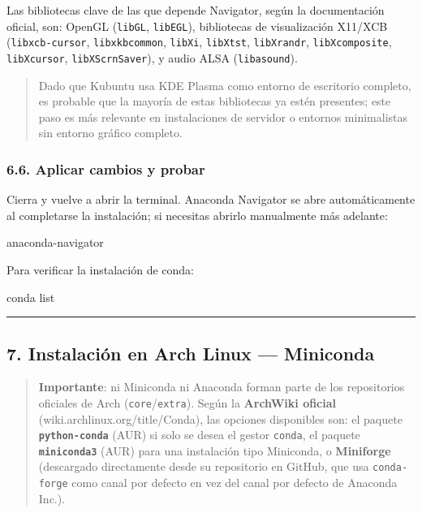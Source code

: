 \documentclass[
  doc,
  floatsintext,
  longtable,
  a4paper,
  nolmodern,
  notxfonts,
  notimes,
  12pt,
  colorlinks=true,linkcolor=blue,citecolor=blue,urlcolor=blue]{apa7}
\newenvironment{Shaded}{\begin{snugshade}}{\end{snugshade}}
\newcommand{\ExtensionTok}[1]{\textcolor[rgb]{0.00,0.23,0.31}{#1}}
\newcommand{\NormalTok}[1]{\textcolor[rgb]{0.00,0.23,0.31}{#1}}
\begin{document}
Las bibliotecas clave de las que depende Navigator, según la
documentación oficial, son: OpenGL (\texttt{libGL}, \texttt{libEGL}),
bibliotecas de visualización X11/XCB (\texttt{libxcb-cursor},
\texttt{libxkbcommon}, \texttt{libXi}, \texttt{libXtst},
\texttt{libXrandr}, \texttt{libXcomposite}, \texttt{libXcursor},
\texttt{libXScrnSaver}), y audio ALSA (\texttt{libasound}).

\begin{quote}
Dado que Kubuntu usa KDE Plasma como entorno de escritorio completo, es
probable que la mayoría de estas bibliotecas ya estén presentes; este
paso es más relevante en instalaciones de servidor o entornos
minimalistas sin entorno gráfico completo.
\end{quote}

\subsubsection{6.6. Aplicar cambios y
probar}\label{aplicar-cambios-y-probar}

Cierra y vuelve a abrir la terminal. Anaconda Navigator se abre
automáticamente al completarse la instalación; si necesitas abrirlo
manualmente más adelante:

\begin{Shaded}
\begin{Highlighting}[]
\ExtensionTok{anaconda{-}navigator}
\end{Highlighting}
\end{Shaded}

Para verificar la instalación de conda:

\begin{Shaded}
\begin{Highlighting}[]
\ExtensionTok{conda}\NormalTok{ list}
\end{Highlighting}
\end{Shaded}

\begin{center}\rule{0.5\linewidth}{0.5pt}\end{center}

\subsection{7. Instalación en Arch Linux ---
Miniconda}\label{instalaciuxf3n-en-arch-linux-miniconda}

\begin{quote}
\textbf{Importante}: ni Miniconda ni Anaconda forman parte de los
repositorios oficiales de Arch (\texttt{core}/\texttt{extra}). Según la
\textbf{ArchWiki oficial} (wiki.archlinux.org/title/Conda), las opciones
disponibles son: el paquete \textbf{\texttt{python-conda}} (AUR) si solo
se desea el gestor \texttt{conda}, el paquete
\textbf{\texttt{miniconda3}} (AUR) para una instalación tipo Miniconda,
o \textbf{Miniforge} (descargado directamente desde su repositorio en
GitHub, que usa \texttt{conda-forge} como canal por defecto en vez del
canal por defecto de Anaconda Inc.).
\end{quote}
\end{document}
